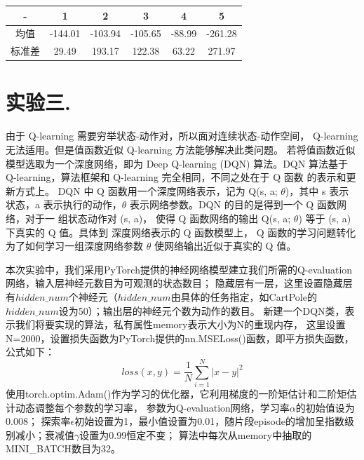 \documentclass[a4paper,UTF8]{article}
\theoremstyle{definition}
\begin{document}

	\begin{tabular}{|c|c|c|c|c|c|}
	
		\hline
		
		\hline
		
		- & 1 & 2 & 3 & 4 & 5 \\
		
		\hline
		
		均值 & -144.01 & -103.94 & -105.65 & -88.99 & -261.28\\

		\hline

		标准差 & 29.49 & 193.17 & 122.38 & 63.22 & 271.97\\
		
		\hline
	
	\end{tabular}

\section*{实验三. }
由于 Q-learning 需要穷举状态-动作对，所以面对连续状态-动作空间， Q-learning 无法适用。但是值函数近似 Q-learning 方法能够解决此类问题。
若将值函数近似模型选取为一个深度网络，即为 Deep Q-learning (DQN) 算法。DQN 算法基于 Q-learning，算法框架和 Q-learning 完全相同，不同之处在于 Q 函数 的表示和更新方式上。
DQN 中 Q 函数用一个深度网络表示，记为 Q(s, a; $\theta$)，其中 s 表示 状态，a 表示执行的动作，$\theta$ 表示网络参数。DQN 的目的是得到一个 Q 函数网络，对于一 组状态动作对 (s, a)，
使得 Q 函数网络的输出 Q(s, a; $\theta$) 等于 (s, a) 下真实的 Q 值。具体到 深度网络表示的 Q 函数模型上，
Q 函数的学习问题转化为了如何学习一组深度网络参数 $\theta$ 使网络输出近似于真实的 Q 值。
	
本次实验中，我们采用PyTorch提供的神经网络模型建立我们所需的Q-evaluation网络，输入层神经元数目为可观测的状态数目；
隐藏层有一层，这里设置隐藏层有$hidden\_num$个神经元（$hidden\_num$由具体的任务指定，如CartPole的$hidden\_num$设为50）；输出层的神经元个数为动作的数目。
新建一个DQN类，表示我们将要实现的算法，私有属性memory表示大小为N的重现内存，
这里设置N=2000，设置损失函数为PyTorch提供的nn.MSELoss()函数，即平方损失函数，公式如下：
$$loss(x, y) = \frac{1}{N} \sum_{i=1}^N |x - y|^2$$
使用torch.optim.Adam()作为学习的优化器，它利用梯度的一阶矩估计和二阶矩估计动态调整每个参数的学习率，
参数为Q-evaluation网络，学习率$\alpha$的初始值设为0.008；
探索率$\epsilon$初始设置为1，最小值设置为0.01，随片段episode的增加呈指数级别减小；衰减值$\gamma$设置为0.99恒定不变；
算法中每次从memory中抽取的MINI\_BATCH数目为32。
\end{document}
